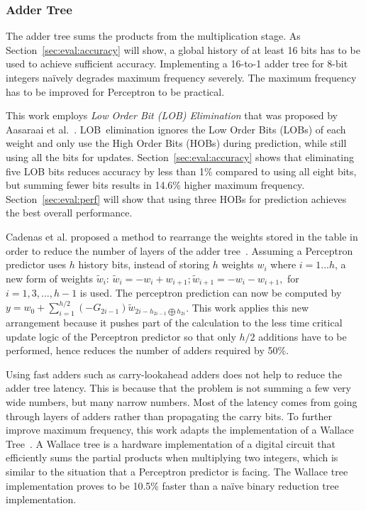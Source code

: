 \documentclass[conference]{IEEEtran}
\begin{document}
\subsubsection{Adder Tree}
\label{sec:fpga:perceptron:adder}
The adder tree sums the products from the multiplication stage. As Section~\ref{sec:eval:accuracy} will show, a global history of at least 16 bits has to be used to achieve sufficient accuracy. Implementing a 16-to-1 adder tree for 8-bit integers na\"ively degrades maximum frequency severely. The maximum frequency has to be improved for Perceptron to be practical.

This work employs \textit{Low Order Bit (LOB) Elimination} that was proposed by Aasaraai et al.~\cite{lob}. LOB\ elimination ignores the Low Order Bits (LOBs) of each weight and only use the High Order Bits (HOBs) during prediction, while still using all the bits for updates. Section~\ref{sec:eval:accuracy} shows that eliminating five LOB bits reduces accuracy by less than 1\% compared to using all eight bits, but summing fewer bits results in 14.6\% higher maximum frequency. Section~\ref{sec:eval:perf} will show that using three HOBs for prediction achieves the best overall performance.

Cadenas et al. proposed a method to rearrange the weights stored in the table in order to reduce the number of layers of the adder tree~\cite{perceptronRearrange}. Assuming a Perceptron predictor uses $h$ history bits, instead of storing $h$ weights $w_i$ where $i = 1 ... h$, a new form of weights $\widetilde{w}_i$: $\widetilde{w}_i = - w_i + w_{i+1}; \widetilde{w}_{i+1} = - w_i - w_{i+1},$ for $i = 1, 3, ..., h-1$ is used. The perceptron prediction can now be computed by $y = w_0 + \sum_{i=1}^{h/2}(-G_{2i-1})\widetilde{w}_{2i-h_{2i-1}\bigoplus h_{2i}}$. This work applies this new arrangement because it pushes part of the calculation to the less time critical update logic of the Perceptron predictor so that only $h/2$ additions have to be performed, hence reduces the number of adders required by 50\%.

Using fast adders such as carry-lookahead adders does not help to reduce the adder tree latency. This is because that the problem is not summing a few very wide numbers, but many narrow numbers. Most of the latency comes from going through layers of adders rather than propagating the carry bits. To further improve maximum frequency, this work adapts the implementation of a Wallace Tree~\cite{wallacetree}. A Wallace tree is a hardware implementation of a digital circuit that efficiently sums the partial products when multiplying two integers, which is similar to the situation that a Perceptron predictor is facing. The Wallace tree implementation proves to be 10.5\% faster than a na\"ive binary reduction tree implementation.
\end{document}
